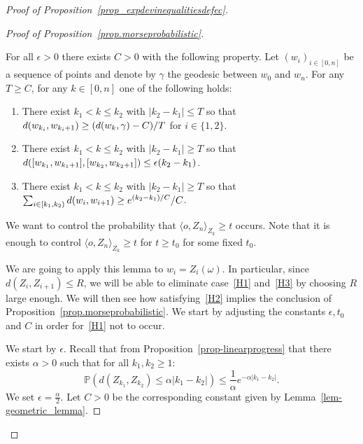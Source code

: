 \documentclass[AHL,Unicode,longabstracts,published]{cedram}
\newcommand{\bP}{\mathbb{P}}
\newcommand{\g}{\gamma}
\newcommand*{\Henumi}{\renewcommand*{\theenumi}{H\arabic{enumi}}}
\begin{document}
\begin{proof}[{Proof of Proposition~\ref{prop_expdevinequalitiesdefec}}]
\begin{proof}[{Proof of Proposition~\ref{prop.morseprobabilistic}}]
\begin{lemm}\label{lem-geometric_lemma}
For all $\epsilon>0$ there exists $C>0$ with the following property. Let $(w_i)_{i\in [0,n]}$ be a sequence of points and denote by $\g$ the geodesic between $w_0$ and $w_n$. For any $T\geq C$, for any $k\in [0, n]$ one of the following holds:
\begin{enumerate}\Henumi
\item\label{H1} There exist $k_1<k\leq k_2$ with $|k_2-k_1|\leq T$ so that $d(w_{k_i}, w_{k_i+1})\geq (d(w_k,\g)\linebreak -C)/T$ for $i\in \{ 1, 2\}$.
\item\label{H2} There exist $k_1<k\leq k_2$ with $|k_2-k_1|\geq T$ so that $d([w_{k_1}, w_{k_1+1}], [w_{k_2}, w_{k_2+1}])\linebreak \leq \epsilon (k_2-k_1)$.
\item\label{H3} There exist $k_1<k\leq k_2$ with $|k_2-k_1|\geq T$ so that $\sum_{i \in [k_1, k_2)} d(w_i, w_{i+1})\linebreak \geq e^{(k_2-k_1)/C}/C$.
\end{enumerate}
\end{lemm}



We want to control the probability that $\langle o, Z_{n}\rangle_{Z_k} \geq t$ occurs. Note that it is enough to control $\langle o, Z_{n}\rangle_{Z_k} \geq t$ for $t \ge t_0$ for some fixed $t_0$.

We are going to apply this lemma to $w_i = Z_i(\omega)$. In particular, since $d(Z_i,Z_{i+1}) \leq R$, we will be able to eliminate case~\eqref{H1} and~\eqref{H3} by choosing $R$ large enough. We will then see how satisfying~\eqref{H2} implies the conclusion of Proposition~\ref{prop.morseprobabilistic}. We start by adjusting the constants $\epsilon, t_0$ and $C$ in order for~\eqref{H1} not to occur. 

We start by $\epsilon$. Recall that from Proposition~\ref{prop-linearprogress} that there exists $\alpha >0$ such that for all $k_1,k_2\geq 1$:
\begin{equation}\label{spectral -equation}
\bP\left(d\left(Z_{k_1},Z_{k_2}\right) \leq \alpha \left|k_1-k_2\right|\right) \leq \frac{1}{\alpha} e^{-\alpha\left|k_1-k_2\right|}.
\end{equation}
We set $\epsilon = \frac{\alpha}{2}$. Let $C>0$ be the corresponding constant given by Lemma~\ref{lem-geometric_lemma}. 


\end{proof}
\end{proof}
\end{document}
